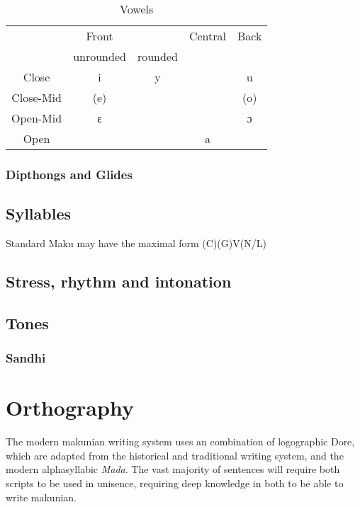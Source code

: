 \documentclass{article}
\newcommand\name{Maku }
\begin{document}
          \begin{table}[htp]
     \centering
               \begin{tabular}{c|cccc}
                   \toprule
                   & Front & & Central & Back \\ 
                   & unrounded & rounded & & \\\midrule
                   Close & i & y & & u \\
                    Close-Mid & (e) & & & (o) \\          
                    Open-Mid & ɛ & & & ɔ \\                     
                    Open & & & a & \\ 
                   \bottomrule  
               \end{tabular}
        \caption{Vowels} 
          \end{table} 
 

    \subsubsection{Dipthongs and Glides}
    \subsection{Syllables}
    Standard \name may have the maximal form (C)(G)V(N/L)
    \subsection{Stress, rhythm and intonation}
    \subsection{Tones}
    \subsubsection{Sandhi}
   
    \newpage
    \section{Orthography}
    The modern makunian writing system uses an combination of logographic Dore, which are adapted from the historical and traditional writing system, and the modern alphasyllabic \emph{Mada}. The vast majority of sentences will require both scripts to be used in unisence, requiring deep knowledge in both to be able to write makunian.
\end{document}
